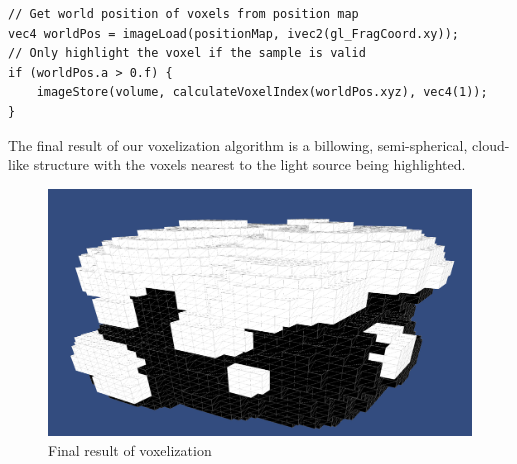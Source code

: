 \begin{lstlisting}[caption={second\_voxelize.glsl, 34}]
// Get world position of voxels from position map
vec4 worldPos = imageLoad(positionMap, ivec2(gl_FragCoord.xy));
// Only highlight the voxel if the sample is valid
if (worldPos.a > 0.f) {
    imageStore(volume, calculateVoxelIndex(worldPos.xyz), vec4(1));
}
\end{lstlisting}

The final result of our voxelization algorithm is a billowing, semi-spherical, cloud-like structure with the voxels nearest to the light source being highlighted. 

\begin{figure}[h]
\centering
\includegraphics[width=\textwidth]{../res/billowing.png}
\caption{Final result of voxelization}
\end{figure}

